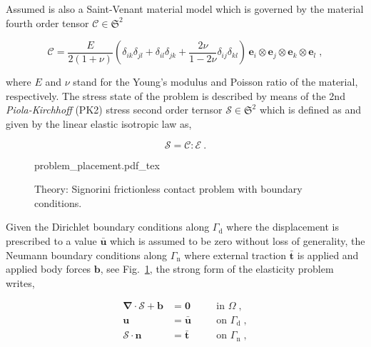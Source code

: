 \documentclass[10pt,a4paper]{article}
\begin{document}
Assumed is also a Saint-Venant material model which is governed by the material fourth order tensor $\boldsymbol{\mathcal{C}} \in \mathfrak{S}^2$

\begin{equation}
	\boldsymbol{\mathcal{C}} = \frac{E}{2 (1 + \nu)} \left( \delta_{ik} \delta_{jl} + \delta_{il} \delta_{jk} + \frac{2 \nu}{1 - 2 \nu} \delta_{ij} \delta_{kl} \right) \, \mathbf{e}_i \otimes \mathbf{e}_j \otimes \mathbf{e}_k \otimes \mathbf{e}_l \;, \label{eq:material_tensor}
\end{equation}

where $E$ and $\nu$ stand for the Young's modulus and Poisson ratio of the material, respectively. The stress state of the problem is described by means of the 2nd \textit{Piola-Kirchhoff} (PK2) stress second order ternsor $\boldsymbol{\mathcal{S}} \in \mathfrak{S}^2$ which is defined as and given by the linear elastic isotropic law as,

\begin{equation}
	\boldsymbol{\mathcal{S}} = \boldsymbol{\mathcal{C}}  : \boldsymbol{\mathcal{E}} \:.
\end{equation}

\begin{figure}[!t]
	\centering
	\footnotesize
    \def\svgwidth{0.5\textwidth}{problem_placement.pdf_tex}
	\caption{Theory: Signorini frictionless contact problem with boundary conditions.}
	\label{im:signorini_contact_problem}
\end{figure}

Given the Dirichlet boundary conditions along $\Gamma_{\text{d}}$ where the displacement is prescribed to a value $\bar{\mathbf{u}}$ which is assumed to be zero without loss of generality, the Neumann boundary conditions along $\Gamma_{\text{n}}$ where external traction $\bar{\mathbf{t}}$ is applied and applied body forces $\mathbf{b}$, see Fig.~\ref{im:signorini_contact_problem}, the strong form of the elasticity problem writes,

\begin{subequations}
	\begin{alignat}{2}
		\boldsymbol{\nabla} \cdot \boldsymbol{\mathcal{S}} + \mathbf{b} &= \mathbf{0} \quad &&\text{in } \Omega \;, \label{eq:strong_equilibrium} \\
		\mathbf{u} &= \bar{\mathbf{u}} &&\text{on } \Gamma_{\text{d}} \;, \label{eq:prescribed_displacement} \\
		\boldsymbol{\mathcal{S}} \cdot \mathbf{n} &= \bar{\mathbf{t}} &&\text{on } \Gamma_{\text{n}} \;,
	\end{alignat}
	\label{eq:strong_formulation}
\end{subequations}
\end{document}

